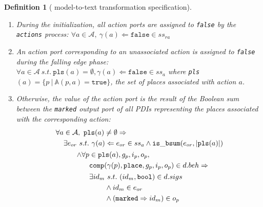 \documentclass[pdflatex,sn-mathphys]{sn-jnl}%
\theoremstyle{thmstyleone}%
\theoremstyle{thmstyletwo}%
\theoremstyle{thmstylethree}%
\newtheorem{definition}{Definition}%
\begin{document}
\begin{definition}[\hilecop{} model-to-text transformation specification]
\begin{enumerate}[resume]
\begin{enumerate}
    \item During the initialization, all action ports are assigned to
      \texttt{false} by the \texttt{actions} process:
      $\forall{}a\in\mathcal{A},~\gamma(a)\Leftarrow\mathtt{false}\in{}ss_{ra}$
      
    \item An action port corresponding to an unassociated action is
      assigned to \texttt{false} during the falling edge
      phase:\\
      $\forall{}a\in\mathcal{A}~s.t.~\mathtt{pls}(a)=\emptyset,\gamma(a)\Leftarrow\mathtt{false}\in{}ss_{a}$
      where
      \texttt{pls}$(a)=\{p~\vert~\mathbb{A}(p,a)=\mathtt{true}\}$, the
      set of places associated with action $a$.
      
    \item Otherwise, the value of the action port is the result of the
      Boolean sum between the \texttt{marked} output port of all PDIs
      representing the places associated with the corresponding
      action:
      \begin{equation*}
        \begin{aligned}[t]
          \forall{}a&\in\mathcal{A},~\mathtt{pls}(a)\neq\emptyset\Rightarrow \\
                    &  \begin{aligned}[t]
                         \exists{}e_{or}& ~s.t.~\gamma(a)\Leftarrow{}e_{or}\in{}ss_a\land\mathtt{is\_bsum}(e_{or},\vert{}\mathtt{pls}(a)\vert) \\
                                        &
                                          \begin{aligned}
                                            \land\forall{}p& \in\mathtt{pls}(a),g_p,i_p,o_p, \\
                                                           & \pdiInBeh\Rightarrow \\
                                                           &
                                                             \begin{aligned}
                                                               \exists{}id_m& ~s.t.~(id_m,\mathtt{bool})\in{}d.sigs \\
                                                                            &\land{}id_m\in{}e_{or} \\
                                                                            & \land(\mathtt{marked}\Rightarrow{}id_m)\in{}o_p \\

\end{aligned}
\end{aligned}
\end{aligned}
\end{aligned}
\end{equation*}
\end{enumerate}
\end{enumerate}
\end{definition}
\end{document}
